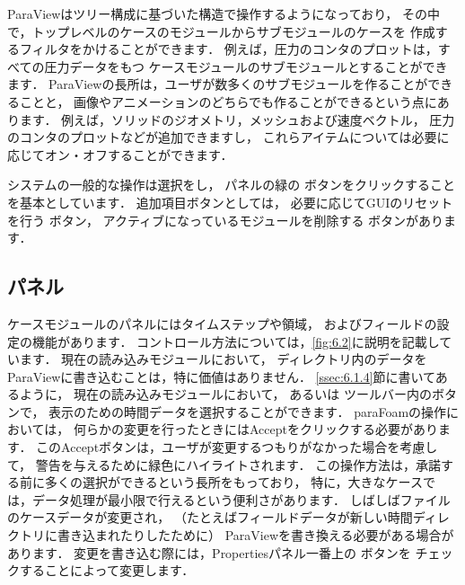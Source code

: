 ParaViewはツリー構成に基づいた構造で操作するようになっており，
その中で，トップレベルのケースのモジュールからサブモジュールのケースを
作成するフィルタをかけることができます．
例えば，圧力のコンタのプロットは，すべての圧力データをもつ
ケースモジュールのサブモジュールとすることができます．
ParaViewの長所は，ユーザが数多くのサブモジュールを作ることができることと，
画像やアニメーションのどちらでも作ることができるという点にあります．
例えば，ソリッドのジオメトリ，メッシュおよび速度ベクトル，
圧力のコンタのプロットなどが追加できますし，
これらアイテムについては必要に応じてオン・オフすることができます．

システムの一般的な操作は選択をし，
パネルの緑の
%
%
ボタンをクリックすることを基本としています．
追加項目ボタンとしては，
必要に応じてGUIのリセットを行う
%
%
ボタン，
アクティブになっているモジュールを削除する
%
%
ボタンがあります．


\subsection{パネル}
\label{ssec:6.1.2}
ケースモジュールのパネルにはタイムステップや領域，
およびフィールドの設定の機能があります．
コントロール方法については，\autoref{fig:6.2}に説明を記載しています．
現在の読み込みモジュールにおいて，
ディレクトリ内のデータをParaViewに書き込むことは，特に価値はありません．
\autoref{ssec:6.1.4}節に書いてあるように，
現在の読み込みモジュールにおいて，
%
%
あるいは
%
%
ツールバー内のボタンで，
表示のための時間データを選択することができます．
paraFoamの操作においては，
何らかの変更を行ったときにはAcceptをクリックする必要があります．
このAcceptボタンは，ユーザが変更するつもりがなかった場合を考慮して，
警告を与えるために緑色にハイライトされます．
この操作方法は，承諾する前に多くの選択ができるという長所をもっており，
特に，大きなケースでは，データ処理が最小限で行えるという便利さがあります．
しばしばファイルのケースデータが変更され，
（たとえばフィールドデータが新しい時間ディレクトリに書き込まれたりしたために）
ParaViewを書き換える必要がある場合があります．
変更を書き込む際には，Propertiesパネル一番上の
%
%
ボタンを
チェックすることによって変更します．


